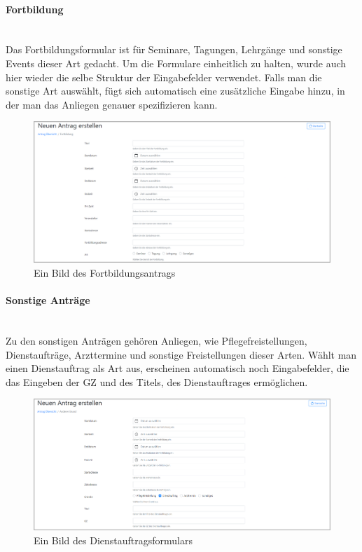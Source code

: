 \paragraph{Fortbildung}
~\\
Das Fortbildungsformular ist für Seminare, Tagungen, Lehrgänge und sonstige Events dieser Art gedacht. Um die Formulare einheitlich zu halten, wurde auch hier wieder die selbe Struktur der Eingabefelder verwendet. Falls man die sonstige Art auswählt, fügt sich automatisch eine zusätzliche Eingabe hinzu, in der man das Anliegen genauer spezifizieren kann.
\begin{figure}[H]
	\centering
	\includegraphics[width=1\linewidth]{images/ldehner_implementierung/fortbildung_1}
	\caption[Fortbildungsantrag]{Ein Bild des Fortbildungsantrags}
	\label{fig:frotbildung}
\end{figure}

\paragraph{Sonstige Anträge}
~\\
Zu den sonstigen Anträgen gehören Anliegen, wie Pflegefreistellungen, Dienstaufträge, Arzttermine und sonstige Freistellungen dieser Arten. Wählt man einen Dienstauftrag als Art aus, erscheinen automatisch noch Eingabefelder, die das Eingeben der GZ und des Titels, des Dienstauftrages ermöglichen.
\begin{figure}[H]
	\centering
	\includegraphics[width=1\linewidth]{images/ldehner_implementierung/dienstauftrag}
	\caption[Dienstreiseauftrag]{Ein Bild des Dienstauftragsformulars}
	\label{fig:dienst}
\end{figure}

